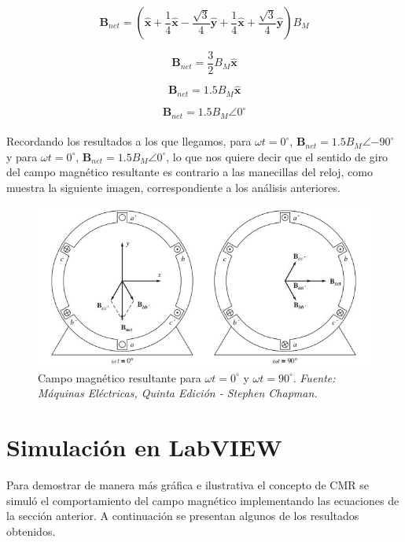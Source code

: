 \documentclass[12pt,a4paper,openany]{article}
\begin{document}
	\begin{equation*}
		\mathbf{B}_{net}=\left(\mathbf{\hat{x}}+\frac{1}{4}\mathbf{\hat{x}}-\frac{\sqrt{3}}{4}\mathbf{\hat{y}}+\frac{1}{4}\mathbf{\hat{x}}+\frac{\sqrt{3}}{4}\mathbf{\hat{y}}\right)B_M
	\end{equation*}
	
	\begin{equation*}
		\mathbf{B}_{net}=\frac{3}{2}B_M\mathbf{\hat{x}}
	\end{equation*}
	
	\begin{equation*}
		\mathbf{B}_{net}=1.5B_M\mathbf{\hat{x}}
	\end{equation*}
	
	\begin{equation*}
		\mathbf{B}_{net}=1.5B_M\angle{0^\circ}
	\end{equation*}
	\\
	Recordando los resultados a los que llegamos, para $\omega t=0^{\circ}$, $\mathbf{B}_{net}=1.5B_M\angle{-90^{\circ}}$ y para $\omega t=0^{\circ}$, $\mathbf{B}_{net}=1.5B_M\angle{0^\circ}$, lo que nos quiere decir que el sentido de giro del campo magnético resultante es contrario a las manecillas del reloj, como muestra la siguiente imagen, correspondiente a los análisis anteriores.
	
	\begin{figure}[H]
		\centering
		\includegraphics[width=1\linewidth]{Images/Campo_magnético_resultante_0_90}
		\caption{Campo magnético resultante para $\omega t=0^{\circ}$ y $\omega t=90^{\circ}$. \textit{Fuente: Máquinas Eléctricas, Quinta Edición - Stephen Chapman.}}
		\label{fig:campomagneticoresultante090}
	\end{figure}
	
	\section{Simulación en LabVIEW}
	Para demostrar de manera más gráfica e ilustrativa el concepto de CMR se simuló el comportamiento del campo magnético implementando las ecuaciones de la sección anterior. A continuación se presentan algunos de los resultados obtenidos.
	
\end{document}
